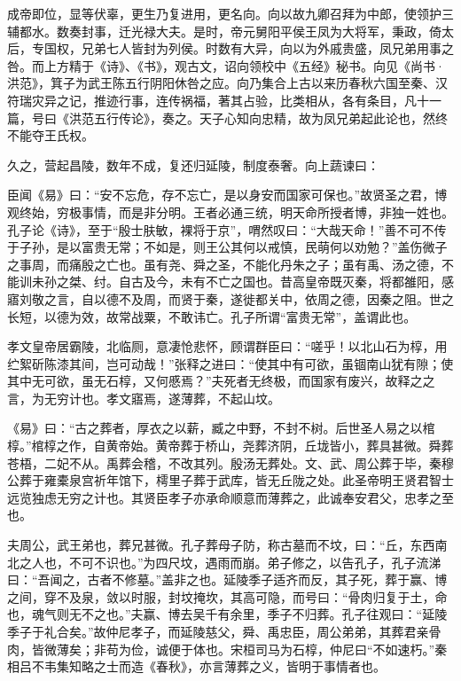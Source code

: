 \documentclass[]{article}
\begin{document}
成帝即位，显等伏辜，更生乃复进用，更名向。向以故九卿召拜为中郎，使领护三辅都水。数奏封事，迁光禄大夫。是时，帝元舅阳平侯王凤为大将军，秉政，倚太后，专国权，兄弟七人皆封为列侯。时数有大异，向以为外戚贵盛，凤兄弟用事之咎。而上方精于《诗》、《书》，观古文，诏向领校中《五经》秘书。向见《尚书·洪范》，箕子为武王陈五行阴阳休咎之应。向乃集合上古以来历春秋六国至秦、汉符瑞灾异之记，推迹行事，连传祸福，著其占验，比类相从，各有条目，凡十一篇，号曰《洪范五行传论》，奏之。天子心知向忠精，故为凤兄弟起此论也，然终不能夺王氏权。

久之，营起昌陵，数年不成，复还归延陵，制度泰奢。向上蔬谏曰：

臣闻《易》曰：``安不忘危，存不忘亡，是以身安而国家可保也。''故贤圣之君，博观终始，穷极事情，而是非分明。王者必通三统，明天命所授者博，非独一姓也。孔子论《诗》，至于``殷士肤敏，裸将于京''，喟然叹曰：``大哉天命！''善不可不传于子孙，是以富贵无常；不如是，则王公其何以戒慎，民萌何以劝勉？''盖伤微子之事周，而痛殷之亡也。虽有尧、舜之圣，不能化丹朱之子；虽有禹、汤之德，不能训未孙之桀、纣。自古及今，未有不亡之国也。昔高皇帝既灭秦，将都雒阳，感寤刘敬之言，自以德不及周，而贤于秦，遂徙都关中，依周之德，因秦之阻。世之长短，以德为效，故常战粟，不敢讳亡。孔子所谓``富贵无常''，盖谓此也。

孝文皇帝居霸陵，北临厕，意凄怆悲怀，顾谓群臣曰：``嗟乎！以北山石为椁，用纻絮斫陈漆其间，岂可动哉！''张释之进曰：``使其中有可欲，虽锢南山犹有隙；使其中无可欲，虽无石椁，又何慼焉？''夫死者无终极，而国家有废兴，故释之之言，为无穷计也。孝文寤焉，遂薄葬，不起山坟。

《易》曰：``古之葬者，厚衣之以薪，臧之中野，不封不树。后世圣人易之以棺椁。''棺椁之作，自黄帝始。黄帝葬于桥山，尧葬济阴，丘垅皆小，葬具甚微。舜葬苍梧，二妃不从。禹葬会稽，不改其列。殷汤无葬处。文、武、周公葬于毕，秦穆公葬于雍橐泉宫祈年馆下，樗里子葬于武库，皆无丘陇之处。此圣帝明王贤君智士远览独虑无穷之计也。其贤臣孝子亦承命顺意而薄葬之，此诚奉安君父，忠孝之至也。

夫周公，武王弟也，葬兄甚微。孔子葬母子防，称古墓而不坟，曰：``丘，东西南北之人也，不可不识也。''为四尺坟，遇雨而崩。弟子修之，以告孔子，孔子流涕曰：``吾闻之，古者不修墓。''盖非之也。延陵季子适齐而反，其子死，葬于赢、博之间，穿不及泉，敛以时服，封坟掩坎，其高可隐，而号曰：``骨肉归复于土，命也，魂气则无不之也。''夫赢、博去吴千有余里，季子不归葬。孔子往观曰：``延陵季子于礼合矣。''故仲尼孝子，而延陵慈父，舜、禹忠臣，周公弟弟，其葬君亲骨肉，皆微薄矣；非苟为俭，诚便于体也。宋桓司马为石椁，仲尼曰``不如速朽。''秦相吕不韦集知略之士而造《春秋》，亦言薄葬之义，皆明于事情者也。
\end{document}
